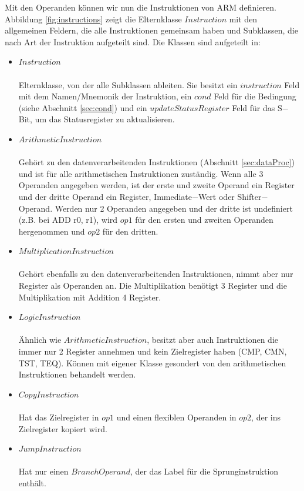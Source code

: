 \documentclass[a4paper, 11pt, onecolumn]{article}
\begin{document}
Mit den Operanden können wir nun die Instruktionen von ARM definieren. Abbildung \ref{fig:instructions} zeigt die Elternklasse $Instruction$ mit den allgemeinen Feldern, die alle Instruktionen gemeinsam haben und Subklassen, die nach Art der Instruktion aufgeteilt sind. Die Klassen sind aufgeteilt in:
\newpage
\begin{itemize}
\item $Instruction$\\ \\Elternklasse, von der alle Subklassen ableiten. Sie besitzt ein $instruction$ Feld mit dem Namen/Mnemonik der Instruktion, ein $cond$ Feld für die Bedingung (siehe Abschnitt \ref{sec:cond}) und ein $updateStatusRegister$ Feld für das S$-$Bit, um das Statusregister zu aktualisieren.
\item $ArithmeticInstruction$\\ \\Gehört zu den datenverarbeitenden Instruktionen (Abschnitt \ref{sec:dataProc}) und ist für alle arithmetischen Instruktionen zuständig. Wenn alle 3 Operanden angegeben werden, ist der erste und zweite Operand ein Register und der dritte Operand ein Register, Immediate$-$Wert oder Shifter$-$Operand. Werden nur 2 Operanden angegeben und der dritte ist undefiniert (z.B. bei ADD r0, r1), wird $op1$ für den ersten und zweiten Operanden hergenommen und $op2$ für den dritten.
\item $MultiplicationInstruction$\\ \\Gehört ebenfalls zu den datenverarbeitenden Instruktionen, nimmt aber nur Register als Operanden an. Die Multiplikation benötigt 3 Register und die Multiplikation mit Addition 4 Register.
\item $LogicInstruction$\\ \\Ähnlich wie $ArithmeticInstruction$, besitzt aber auch Instruktionen die immer nur 2 Register annehmen und kein Zielregister haben (CMP, CMN, TST, TEQ). Können mit eigener Klasse gesondert von den arithmetischen Instruktionen behandelt werden.
\item $CopyInstruction$\\ \\Hat das Zielregister in $op1$ und einen flexiblen Operanden in $op2$, der ins Zielregister kopiert wird.
\item $JumpInstruction$\\ \\Hat nur einen $BranchOperand$, der das Label für die Sprunginstruktion enthält.

\end{itemize}
\end{document}
